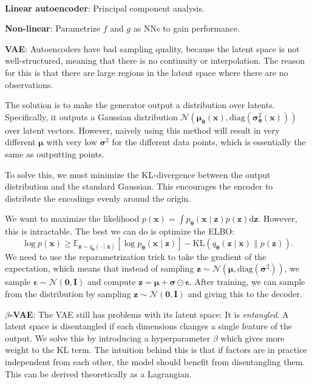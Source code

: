 \documentclass{article}
\newcommand{\E}{\mathbb{E}}
\renewcommand{\vec}[1]{\bm{#1}}
\newcommand{\mat}[1]{\bm{#1}}
\newenvironment{topic}[1]
{\textbf{\sffamily \colorbox{black}{\rlap{\textbf{\textcolor{white}{#1}}}\hspace{\linewidth}\hspace{-2\fboxsep}}} \\ \vspace{0.2cm}}
{}
\begin{document}
\begin{multicols*}{2}
\begin{topic}{Autoencoders}
        \textbf{Linear autoencoder}: Principal component analysis.

        \textbf{Non-linear}: Parametrize $f$ and $g$ as NNs to gain performance.

        \textbf{VAE}: Autoencoders have bad sampling quality, because the latent space is not
        well-structured, meaning that there is no continuity or interpolation. The reason for this is
        that there are large regions in the latent space where there are no observations.

        The solution is to make the generator output a distribution over latents. Specifically, it outputs
        a Gaussian distribution $\mathcal{N}(\vec{\mu}_{\vec{\theta}}(\vec{x}),
            \mathrm{diag}(\vec{\sigma}_{\vec{\theta}}^2(\vec{x})))$ over latent vectors. However, naively using
        this method will result in very different $\vec{\mu}$ with very low $\vec{\sigma}^2$ for the
        different data points, which is essentially the same as outputting points.

        To solve this, we must minimize the KL-divergence between the output distribution and the standard
        Gaussian. This encourages the encoder to distribute the encodings evenly around the origin.

        We want to maximize the likelihood $p(\vec{x}) = \int p_{\vec{\theta}}(\vec{x} \mid \vec{z})
            p(\vec{z}) \mathrm{d}\vec{z}$. However, this is intractable. The best we can do is optimize the
        ELBO: \[
            \log p(\vec{x}) \geq \E_{\vec{z} \sim q_{\vec{\theta}}(\cdot \mid \vec{x})} [\log p_{\vec{\theta}}(\vec{x} \mid \vec{z})] - \mathrm{KL}(q_{\vec{\theta}}(\vec{z} \mid \vec{x}) \lVert p(\vec{z})).
        \]
        We need to use the reparametrization trick to take the gradient of the expectation, which means
        that instead of sampling $\vec{z} \sim \mathcal{N}(\vec{\mu}, \mathrm{diag}(\vec{\sigma}^2))$, we
        sample $\vec{\epsilon} \sim \mathcal{N}(\vec{0}, \mat{I})$ and compute $\vec{z} = \vec{\mu} +
            \vec{\sigma} \odot \vec{\epsilon}$. After training, we can sample from the distribution by sampling
        $\vec{z} \sim \mathcal{N}(\vec{0}, \mat{I})$ and giving this to the decoder.

        \textbf{$\beta$-VAE}: The VAE still has problems with its latent space: It is \textit{entangled}. A
        latent space is disentangled if each dimensions changes a single feature of the output. We
        solve this by introducing a hyperparameter $\beta$ which gives more weight to the KL term. The
        intuition behind this is that if factors are in practice independent from each other, the
        model should benefit from disentangling them. This can be derived theoretically as a
        Lagrangian.


\end{topic}
\end{multicols*}
\end{document}

